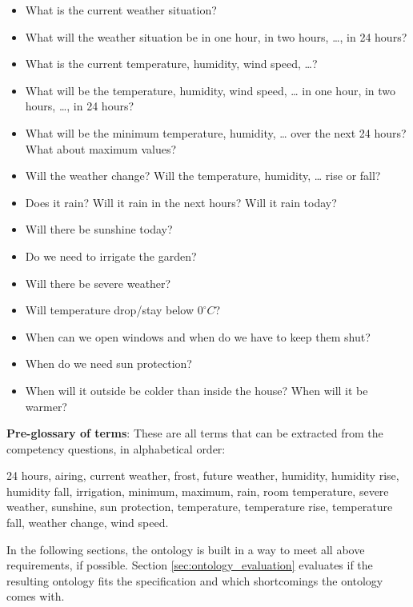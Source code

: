 \begin{mdframed}[linewidth=.6pt]
\begin{itemize}
  \item What is the current weather situation?
  \item What will the weather situation be in one hour, in two hours, …, in 24 hours?
  \item What is the current temperature, humidity, wind speed, …?
  \item What will be the temperature, humidity, wind speed, … in one hour, in two hours, …, in 24 hours?
  \item What will be the minimum temperature, humidity, … over the next 24 hours? What about maximum values?
  \item Will the weather change? Will the temperature, humidity, … rise or fall?
  \item Does it rain? Will it rain in the next hours? Will it rain today?
  \item Will there be sunshine today? 
  \item Do we need to irrigate the garden?
  \item Will there be severe weather?
  \item Will temperature drop/stay below $0^\circ C$?
  \item When can we open windows and when do we have to keep them shut?
  \item When do we need sun protection?
  \item When will it outside be colder than inside the house? When will it be warmer?
\end{itemize}

\setlength{\leftskip}{0cm}

\vspace{.2cm}

\textbf{Pre-glossary of terms}: These are all terms that can be extracted from the competency questions, in alphabetical order:

24 hours, airing, current weather, frost, future weather, humidity, humidity rise, humidity fall, irrigation, minimum, maximum, rain, room temperature, severe weather, sunshine, sun protection, temperature, temperature rise, temperature fall, weather change, wind speed.

\setlength{\leftskip}{0cm}

\end{mdframed}

\vspace{.5cm}

In the following sections, the \thinkhomeweather ontology is built in a way to meet all above requirements, if possible. Section \ref{sec:ontology_evaluation} evaluates if the resulting ontology fits the specification and which shortcomings the ontology comes with.

